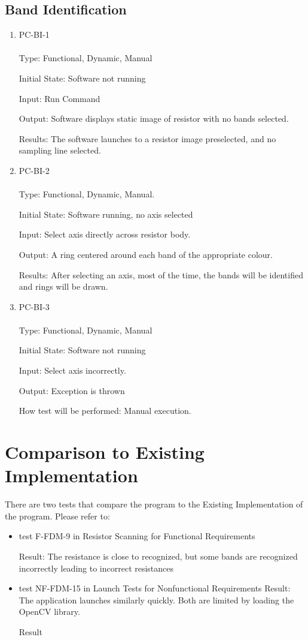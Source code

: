 \documentclass[12pt, titlepage]{article}
\begin{document}
\subsection{Band Identification}
\begin{enumerate}
\item{PC-BI-1\\}
\\
Type: Functional, Dynamic, Manual
					
Initial State: Software not running
					
Input: Run Command
					
Output: Software displays static image of resistor with no bands selected.
					
Results:
The software launches to a resistor image preselected, and no sampling line selected.
					
\item{PC-BI-2\\}
\\
Type: Functional, Dynamic, Manual.
					
Initial State: Software running, no axis selected
					
Input: Select axis directly across resistor body.
					
Output:  A ring centered around each band of the appropriate colour.
					
Results:
After selecting an axis, most of the time, the bands will be identified and rings will be drawn.

\item{PC-BI-3\\}
\\
Type: Functional, Dynamic, Manual
					
Initial State: Software not running
					
Input: Select axis incorrectly.
					
Output: Exception is thrown
					
How test will be performed: Manual execution.

\end{enumerate}

\section{Comparison to Existing Implementation}
There are two tests that compare the program to the Existing Implementation of the program. Please refer to:
\begin{itemize}
\item test F-FDM-9 in Resistor Scanning for Functional Requirements

Result: The resistance is close to recognized, but some bands are recognized incorrectly leading to incorrect resistances

\item test NF-FDM-15 in Launch Tests for Nonfunctional Requirements 
Result: The application launches similarly quickly. Both are limited by loading the OpenCV library.

Result 
\end{itemize}
\end{document}
